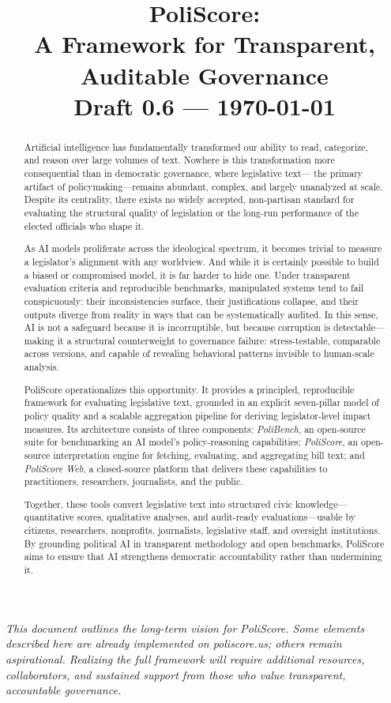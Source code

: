 \documentclass[12pt]{article}
\title{\textbf{PoliScore:\\
A Framework for Transparent, Auditable Governance}\\[0.5em]
\large Draft 0.6 --- \today}
\date{}
\begin{document}
\maketitle

\begin{center}
\textit{\footnotesize
This document outlines the long-term vision for PoliScore. Some elements described here are already implemented on
poliscore.us; others remain aspirational. Realizing the full framework will require additional resources, collaborators, 
and sustained support from those who value transparent, accountable governance.}
\end{center}

\begin{abstract}
Artificial intelligence has fundamentally transformed our ability to read, categorize, and reason over large volumes
of text. Nowhere is this transformation more consequential than in democratic governance, where legislative text—
the primary artifact of policymaking—remains abundant, complex, and largely unanalyzed at scale. Despite its centrality,
there exists no widely accepted, non-partisan standard for evaluating the structural quality of legislation or the
long-run performance of the elected officials who shape it.

As AI models proliferate across the ideological spectrum, it becomes trivial to measure a legislator’s alignment with any
worldview. And while it is certainly possible to build a biased or compromised model, it is far harder to hide one. Under
transparent evaluation criteria and reproducible benchmarks, manipulated systems tend to fail conspicuously: their
inconsistencies surface, their justifications collapse, and their outputs diverge from reality in ways that can be
systematically audited. In this sense, AI is not a safeguard because it is incorruptible, but because corruption is
detectable—making it a structural counterweight to governance failure: stress-testable, comparable across versions, and
capable of revealing behavioral patterns invisible to human-scale analysis.

PoliScore operationalizes this opportunity. It provides a principled, reproducible framework for evaluating legislative
text, grounded in an explicit seven-pillar model of policy quality and a scalable aggregation pipeline for deriving
legislator-level impact measures. Its architecture consists of three components: \emph{PoliBench}, an open-source suite
for benchmarking an AI model's policy-reasoning capabilities; \emph{PoliScore}, an open-source interpretation engine for
fetching, evaluating, and aggregating bill text; and \emph{PoliScore Web}, a closed-source platform that delivers these
capabilities to practitioners, researchers, journalists, and the public.

Together, these tools convert legislative text into structured civic knowledge—quantitative scores, qualitative
analyses, and audit-ready evaluations—usable by citizens, researchers, nonprofits, journalists, legislative staff, and
oversight institutions. By grounding political AI in transparent methodology and open benchmarks, PoliScore aims to
ensure that AI strengthens democratic accountability rather than undermining it.
\end{abstract}
\end{document}
